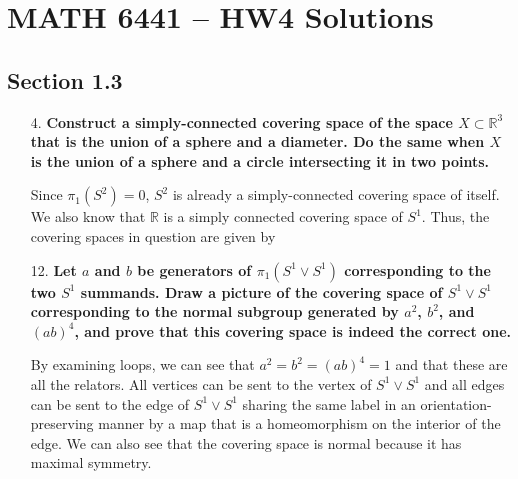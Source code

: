 \documentclass[a4paper,12pt]{article}
\begin{document}
\section*{MATH 6441 -- HW4 Solutions}
\subsection*{Section 1.3}
\begin{enumerate}
    \item[4.]
        \boldmath\textbf{Construct a simply-connected covering space of the space $X \subset \mathbb{R}^3$ that is the union of a sphere and a diameter. Do the same when $X$ is the union of a sphere and a circle intersecting it in two points.
        }\unboldmath \par
        \vspace{4cm}
        Since $\pi_1(S^2) = 0$, $S^2$ is already a simply-connected covering space of itself. We also know that $\mathbb{R}$ is a simply connected covering space of $S^1$. Thus, the covering spaces in question are given by
        \vspace{4cm}

    \item[12.]
        \boldmath\textbf{Let $a$ and $b$ be generators of $\pi_1(S^1 \lor S^1)$ corresponding to the two $S^1$ summands. Draw a picture of the covering space of $S^1 \lor S^1$ corresponding to the normal subgroup generated by $a^2$, $b^2$, and $(ab)^4$, and prove that this covering space is indeed the correct one.
        }\unboldmath \par
        \vspace{5cm}
        By examining loops, we can see that $a^2 = b^2 = (ab)^4 = 1$ and that these are all the relators. All vertices can be sent to the vertex of $S^1 \lor S^1$ and all edges can be sent to the edge of $S^1 \lor S^1$ sharing the same label in an orientation-preserving manner by a map that is a homeomorphism on the interior of the edge. We can also see that the covering space is normal because it has maximal symmetry.


\end{enumerate}
\end{document}
